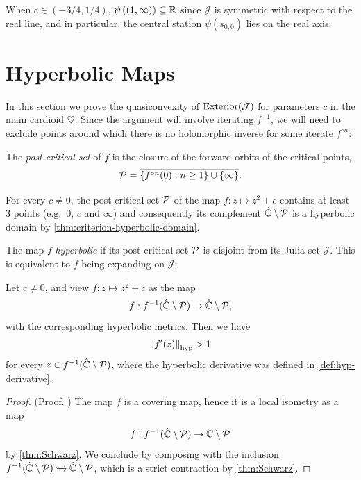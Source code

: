 When $c \in (-3/4, 1/4)$, $\psi\left((1,\infty)\right)\subseteq\mathbb{R}$ since $\mathcal{J}$ is symmetric with respect to the real line, and in particular, the central station $\psi(s_{0,0})$ lies on the real axis.


\section{Hyperbolic Maps}
In this section we prove the quasiconvexity of $\operatorname{Exterior}(\mathcal J)$ for parameters $c$ in the main cardioid $\heartsuit$.
Since the argument will involve iterating $f^{-1}$, 
we will need to exclude points around which there is no holomorphic inverse for some iterate $f^{\circ n}$:

\begin{definition}
	The \emph{post-critical set} of $f$ is the closure of the forward orbits 
	of the critical points,
	\begin{equation*}
		\operatorname{\mathcal P} = \overline{\{f^{\circ n} (0): n \geq 1\} \cup \{\infty\}}.
	\end{equation*}	
\end{definition}
For every $c \neq 0$, the post-critical set $\operatorname{\mathcal P}$ of the map $f: z\mapsto z^2+c$ contains at least $3$ points (e.g.~$0$, $c$ and $\infty$) and consequently its complement $\hat{\mathbb C} \setminus \operatorname{\mathcal P}$
is a hyperbolic domain by \cref{thm:criterion-hyperbolic-domain}.

The map $f$ \emph{hyperbolic} if
 its post-critical set $\operatorname{\mathcal P}$ is disjoint from its Julia set $\mathcal J$.
 This is equivalent to $f$ being expanding on $\mathcal J$:

 \begin{theorem}\label{theorem:hyperbolic_expanding}
Let $c \neq0$, and view $f: z\mapsto z^2+c$ as the map 
$$f: f^{-1}(\hat {\mathbb C} \setminus \operatorname{\mathcal P}) \to \hat {\mathbb C} \setminus \operatorname{\mathcal P},$$
with the corresponding hyperbolic metrics. Then we have 
\begin{equation}\label{eq:hyp-derivative-bound}
	\left\Vert f'(z)\right\Vert_{\operatorname{hyp}} > 1
\end{equation} 
for every $z\in f^{-1}(\hat {\mathbb C} \setminus \operatorname{\mathcal P})$,
where the hyperbolic derivative was defined in \cref{def:hyp-derivative}.
 \end{theorem}
 
 \begin{proof}{(Proof. \cite[Theorem 19.1]{milnor_book})}
	The map $f$ is a covering map, hence it is a local isometry as a map
	$$f: f^{-1}(\hat {\mathbb C} \setminus \operatorname{\mathcal P}) \to \hat {\mathbb C} \setminus \operatorname{\mathcal P}$$
	by \cref{thm:Schwarz}.
	We conclude by composing with the inclusion 
	$f^{-1}(\hat {\mathbb C} \setminus \operatorname{\mathcal P}) \xhookrightarrow{} 
	\hat {\mathbb C} \setminus \operatorname{\mathcal P}$, 
	which is a strict contraction by \cref{thm:Schwarz}.
 \end{proof}

